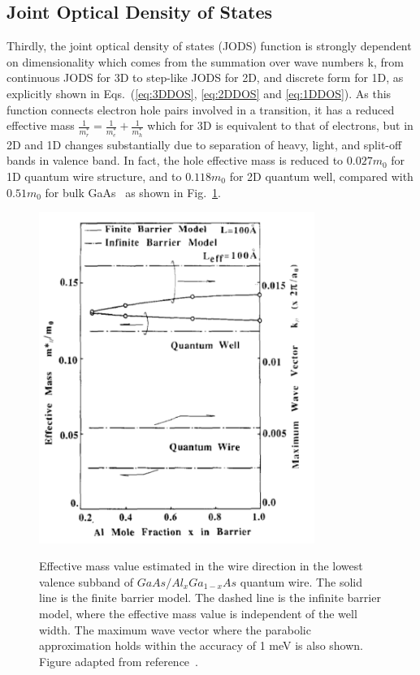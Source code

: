 \subsection{Joint Optical Density of States}

Thirdly, the joint optical density of states (JODS) function is strongly
dependent on dimensionality which comes from the summation over wave numbers k,
from continuous JODS for 3D to step-like JODS for 2D, and discrete form for 1D,
as explicitly shown in Eqs.~(\ref{eq:3DDOS}, \ref{eq:2DDOS} and
\ref{eq:1DDOS}). As this function connects electron hole pairs involved in a
transition, it has a reduced effective mass
$\frac{1}{m_r^\ast}=\frac{1}{m_e^\ast}+\frac{1}{m_h^\ast}$ which for 3D is
equivalent to that of electrons, but in 2D and 1D changes substantially due to
separation of heavy, light, and split-off bands in valence band. In fact, the
hole effective mass is reduced to $0.027m_0$ for 1D quantum wire structure, and
to $0.118m_0$ for 2D quantum well, compared with $0.51m_0$ for bulk
GaAs~\cite{Suemune:1988jw} as shown in Fig.~\ref{EffectiveMass}.

\begin{figure}
  \caption[Effective mass value estimated in the wire direction in the lowest valence subband of $GaAs/Al_xGa_{1-x}As$ quantum wire.]{Effective mass value estimated in the wire direction in the lowest valence subband of $GaAs/Al_xGa_{1-x}As$ quantum wire. The solid line is the finite barrier model. The dashed line is the infinite barrier model, where the effective mass value is independent of the well width. The maximum wave vector where the parabolic approximation holds within the accuracy of 1 meV is also shown. Figure adapted from reference~\cite{Suemune:1988jw}.}
  \centering
  \includegraphics[width=0.8\textwidth]{pictures/RM/EffectiveMass}
  \label{EffectiveMass}
\end{figure}

